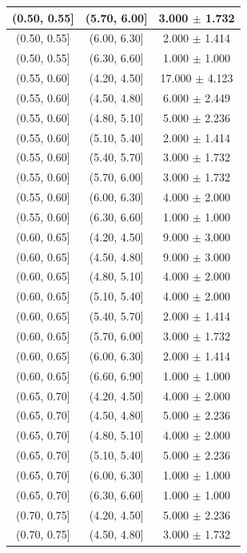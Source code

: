 \begin{longtable}{|c|c|c|}
\hline
(0.50, 0.55] & (5.70, 6.00] & 3.000 $\pm$ 1.732 \\ 
\hline
(0.50, 0.55] & (6.00, 6.30] & 2.000 $\pm$ 1.414 \\ 
\hline
(0.50, 0.55] & (6.30, 6.60] & 1.000 $\pm$ 1.000 \\ 
\hline
(0.55, 0.60] & (4.20, 4.50] & 17.000 $\pm$ 4.123 \\ 
\hline
(0.55, 0.60] & (4.50, 4.80] & 6.000 $\pm$ 2.449 \\ 
\hline
(0.55, 0.60] & (4.80, 5.10] & 5.000 $\pm$ 2.236 \\ 
\hline
(0.55, 0.60] & (5.10, 5.40] & 2.000 $\pm$ 1.414 \\ 
\hline
(0.55, 0.60] & (5.40, 5.70] & 3.000 $\pm$ 1.732 \\ 
\hline
(0.55, 0.60] & (5.70, 6.00] & 3.000 $\pm$ 1.732 \\ 
\hline
(0.55, 0.60] & (6.00, 6.30] & 4.000 $\pm$ 2.000 \\ 
\hline
(0.55, 0.60] & (6.30, 6.60] & 1.000 $\pm$ 1.000 \\ 
\hline
(0.60, 0.65] & (4.20, 4.50] & 9.000 $\pm$ 3.000 \\ 
\hline
(0.60, 0.65] & (4.50, 4.80] & 9.000 $\pm$ 3.000 \\ 
\hline
(0.60, 0.65] & (4.80, 5.10] & 4.000 $\pm$ 2.000 \\ 
\hline
(0.60, 0.65] & (5.10, 5.40] & 4.000 $\pm$ 2.000 \\ 
\hline
(0.60, 0.65] & (5.40, 5.70] & 2.000 $\pm$ 1.414 \\ 
\hline
(0.60, 0.65] & (5.70, 6.00] & 3.000 $\pm$ 1.732 \\ 
\hline
(0.60, 0.65] & (6.00, 6.30] & 2.000 $\pm$ 1.414 \\ 
\hline
(0.60, 0.65] & (6.60, 6.90] & 1.000 $\pm$ 1.000 \\ 
\hline
(0.65, 0.70] & (4.20, 4.50] & 4.000 $\pm$ 2.000 \\ 
\hline
(0.65, 0.70] & (4.50, 4.80] & 5.000 $\pm$ 2.236 \\ 
\hline
(0.65, 0.70] & (4.80, 5.10] & 4.000 $\pm$ 2.000 \\ 
\hline
(0.65, 0.70] & (5.10, 5.40] & 5.000 $\pm$ 2.236 \\ 
\hline
(0.65, 0.70] & (6.00, 6.30] & 1.000 $\pm$ 1.000 \\ 
\hline
(0.65, 0.70] & (6.30, 6.60] & 1.000 $\pm$ 1.000 \\ 
\hline
(0.70, 0.75] & (4.20, 4.50] & 5.000 $\pm$ 2.236 \\ 
\hline
(0.70, 0.75] & (4.50, 4.80] & 3.000 $\pm$ 1.732 \\ 

\end{longtable}
